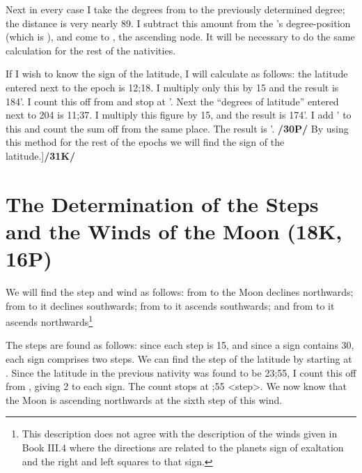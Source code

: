 Next in every case I take the degrees from \Taurus\xspace to the previously determined degree; the distance is very nearly 89\deg. I subtract this amount from the \Moon’s degree-position (which is \Scorpio\xspace 7\deg), and come to \Leo\xspace 8\deg, the ascending node. It will be necessary to do the same calculation for the rest of the nativities.

If I wish to know the sign of the latitude, I will calculate as follows: the latitude entered next to the epoch is 12;18. I multiply only this by 15\deg\xspace and the result is 184\deg\xspace 30'. I count this off from \Leo\xspace and stop
at \deg\xspace 30'. Next the “degrees of latitude” entered next to 204 is 11;37. I multiply this figure by
15\deg, and the result is 174\deg\xspace 15'. I add \Aquarius\xspace 4\deg\xspace 30' to this and count the sum off from the same place. The result is \deg\xspace 45'. \textbf{/30P/} By using this method for the rest of the epochs we will find the sign of the latitude.]\textbf{/31K/}

\newpage
\section{The Determination of the Steps and the Winds of the Moon (18K, 16P)}
We will find the step and wind as follows: from \Leo\xspace to \Libra\xspace the Moon declines northwards; from \Scorpio\xspace to \Capricorn\xspace it declines southwards; from \Aquarius\xspace to \Aries\xspace it ascends southwards; and from \Taurus\xspace to \Cancer\xspace it ascends northwards\footnote{This description does not agree with the description of the winds given in Book III.4 where the directions are related to the planets sign of exaltation and the right and left squares to that sign.}

The steps are found as follows: since each step is 15\deg, and since a sign contains 30\deg, each sign comprises two steps. We can find the step of the latitude by starting at \Leo. Since the latitude in the previous nativity was found to be 23;55, I count this off from \Leo, giving 2 to each sign. The count stops at \Cancer\xspace 1;55 <step>. We now know that the Moon is ascending northwards at the sixth step of this wind.

\newpage